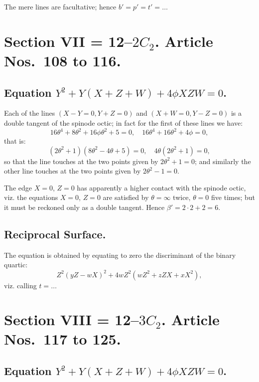 \documentclass[11pt,a4paper]{article}
\begin{document}
The mere lines are facultative; hence $b' = p' = t' = \ldots$

\section*{Section VII = 12--$2C_2$. \quad Article Nos.~108 to 116.}

\setcounter{section}{108}
\subsection*{Equation $Y^2 + Y(X+Z+W) + 4\phi XZW = 0$.}

Each of the lines $(X - Y = 0, Y + Z = 0)$ and $(X + W = 0, Y - Z = 0)$ is a double tangent of the spinode octic; in fact for the first of these lines we have:
\begin{equation*}
16\theta^4 + 8\theta^2 + 16\phi\theta^2 + 5 = 0, \quad 16\theta^4 + 16\theta^2 + 4\phi = 0,
\end{equation*}
that is:
\begin{equation*}
(2\theta^2 + 1)(8\theta^2 - 4\theta + 5) = 0, \quad 4\theta(2\theta^2 + 1) = 0,
\end{equation*}
so that the line touches at the two points given by $2\theta^2 + 1 = 0$; and similarly the other line touches at the two points given by $2\theta^2 - 1 = 0$.

The edge $X = 0$, $Z = 0$ has apparently a higher contact with the spinode octic, viz. the equations $X = 0$, $Z = 0$ are satisfied by $\theta = \infty$ twice, $\theta = 0$ five times; but it must be reckoned only as a double tangent. Hence $\beta' = 2 \cdot 2 + 2 = 6$.

\subsection*{Reciprocal Surface.}

The equation is obtained by equating to zero the discriminant of the binary quartic:
\begin{equation*}
Z^2(yZ - wX)^2 + 4wZ^2(wZ^2 + zZX + xX^2),
\end{equation*}
viz. calling $t = \ldots$

\section*{Section VIII = 12--$3C_2$. \quad Article Nos.~117 to 125.}

\setcounter{section}{117}
\subsection*{Equation $Y^2 + Y(X+Z+W) + 4\phi XZW = 0$.}
\end{document}
